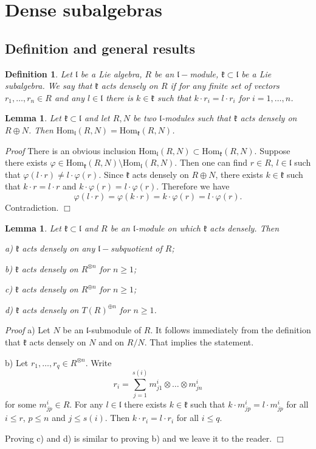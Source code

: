 \documentclass{svmult}
\newtheorem{lem}[theo]{Lemma}
\renewenvironment{proof}{ \emph{Proof}}{$\Box$}
\newtheorem{defi}[theo]{Definition}
\newcommand{\kk}{\mathfrak{k}}
\renewcommand{\ll}{\mathfrak{l}}
\renewcommand {\phi} {\varphi}
\newcommand{\Hom}{\mathrm{Hom}}
\begin{document}
\vspace{0.33cm}

\section{Dense subalgebras}\label{sect:7}
\subsection {Definition and general results}\label{sect:7.1}
\begin{defi}\label{dense_salg}Let $\ll$ be a Lie algebra, $R$ be an $\ll-$module, $\kk\subset \ll$ be a Lie subalgebra. We say that $\kk$ acts \textit{densely}
on $R$ if for any finite set of vectors $r_1,\dots,r_n \in R$ and any $l\in \ll$ there is $k\in\kk$ such that $k\cdot r_i = l\cdot r_i$ for $i=1,\dots,n$.
\end{defi}

\begin{lem}\label{denshom}  Let $\kk\subset\ll$ and let $R,N$ be two $\ll$-modules such that $\kk$ acts densely on $R\oplus N$. Then 
$\Hom_\ll(R,N)=\Hom_\kk(R,N)$.
\end{lem}

\begin{proof} There is an obvious inclusion  $\Hom_\ll(R,N)\subset\Hom_\kk(R,N)$. Suppose there exists $\varphi\in \Hom_\kk(R,N)\setminus \Hom_\ll(R,N)$.
Then one can find $r\in R$, $l\in\ll$ such that $\varphi(l\cdot r)\neq l\cdot \phi(r)$. Since $\kk$ acts densely on $R \oplus N$,
there exists $k\in\kk$ such that $k \cdot r = l \cdot r$ and $k \cdot \varphi(r) = l \cdot \varphi (r)$.
Therefore we have
$$\phi(l \cdot r)=\varphi(k \cdot r)= k \cdot \phi(r) = l \cdot \phi(r).$$
Contradiction.
\end{proof}

\begin{lem}\label{densprop} Let $\kk\subset\ll$ and $R$ be an $\ll$-module on which $\kk$ acts densely. Then 

a) $\kk$ acts densely on any $\ll-$subquotient of $R$;

b) $\kk$ acts densely on $R^{\otimes n}$ for $n \geq 1$;

c)  $\kk$ acts densely on $R^{\oplus n}$ for $n \geq 1$;

d)  $\kk$ acts densely on $T(R)^{\oplus n}$ for $n \geq 1$.
\end{lem}
\begin{proof} a) Let $N$ be an $\ll$-submodule of $R$. It follows immediately from the definition that $\kk$ acts densely on $N$
and on $R/N$. That implies the statement.

b) Let $r_1,\dots, r_q\in R^{\otimes n}$. Write 
$$r_i=\sum_{j=1}^{s(i)}m^i_{j1}\otimes\dots\otimes m^i_{jn}$$
for some $m^i_{jp}\in R$. For any $l\in \ll$ there exists $k\in\kk$ such that $k \cdot m^i_{jp} = l \cdot m^i_{jp}$ for all $i\leq r$, $p\leq n$ and $j\leq s(i)$.
Then $k \cdot r_i = l \cdot r_i$ for all $i\leq q$.

Proving c) and d) is similar to proving b) and we leave it to the reader.
\end{proof}
\end{document}
